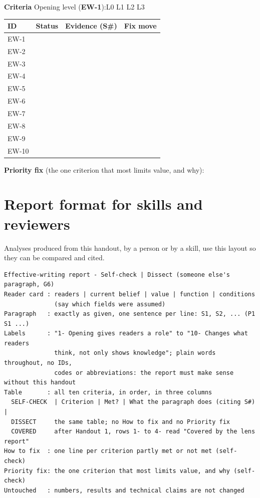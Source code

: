 \documentclass[11pt]{article}
\newcommand{\id}[1]{{\sffamily\bfseries\color{accent}#1}}              %
\begin{document}
\textbf{Criteria} \hfill {\small Opening level (\id{EW-1}):\enspace L0 \enspace L1 \enspace L2 \enspace L3}\par
{\small
\begin{tabularx}{\linewidth}{@{}|l|c|X|X|@{}}
\hline
\sffamily\bfseries ID & \sffamily\bfseries Status & \sffamily\bfseries Evidence (S\#) & \sffamily\bfseries Fix move \\ \hline
EW-1  & & & \\ \hline
EW-2  & & & \\ \hline
EW-3  & & & \\ \hline
EW-4  & & & \\ \hline
EW-5  & & & \\ \hline
EW-6  & & & \\ \hline
EW-7  & & & \\ \hline
EW-8  & & & \\ \hline
EW-9  & & & \\ \hline
EW-10 & & & \\ \hline
\end{tabularx}
}
\renewcommand{\arraystretch}{1}

\textbf{Priority fix} (the one criterion that most limits value, and why): \hrulefill\par
\vspace{4pt}\hrulefill

\section{Report format for skills and reviewers}

Analyses produced from this handout, by a person or by a skill, use this layout so they can be compared and
cited.

\begin{panel}[breakable=false]
\footnotesize
\begin{verbatim}
Effective-writing report - Self-check | Dissect (someone else's paragraph, G6)
Reader card : readers | current belief | value | function | conditions
              (say which fields were assumed)
Paragraph   : exactly as given, one sentence per line: S1, S2, ... (P1 S1 ...)
Labels      : "1- Opening gives readers a role" to "10- Changes what readers
              think, not only shows knowledge"; plain words throughout, no IDs,
              codes or abbreviations: the report must make sense without this handout
Table       : all ten criteria, in order, in three columns
  SELF-CHECK  | Criterion | Met? | What the paragraph does (citing S#) |
  DISSECT     the same table; no How to fix and no Priority fix
  COVERED     after Handout 1, rows 1- to 4- read "Covered by the lens report"
How to fix  : one line per criterion partly met or not met (self-check)
Priority fix: the one criterion that most limits value, and why (self-check)
Untouched   : numbers, results and technical claims are not changed
\end{verbatim}
\end{panel}
\end{document}
